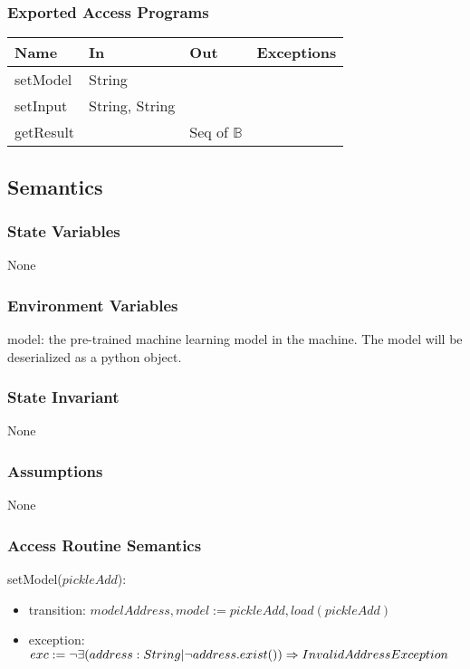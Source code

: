 \documentclass[12pt, titlepage]{article}
\begin{document}
\subsubsection{Exported Access Programs}

\begin{tabular}{l l l l}
\hline
\textbf{Name} & \textbf{In} & \textbf{Out} & \textbf{Exceptions} \\
\hline
setModel & String & ~ & ~\\
setInput & String, String & ~ & ~ \\
getResult & ~ & Seq of $\mathbb{B}$ & ~ \\
\hline
\end{tabular}

\subsection{Semantics}

\subsubsection{State Variables}
None

\subsubsection{Environment Variables}
model: the pre-trained machine learning model in the machine. The model will be
deserialized as a python object.

\subsubsection{State Invariant}
None

\subsubsection{Assumptions}
None

\subsubsection{Access Routine Semantics}

\noindent setModel($pickleAdd$):
\begin{itemize}
\item transition: $modelAddress, model := pickleAdd, load(pickleAdd)$
\item exception:  $exc := \neg \exists (address : String | \neg address.exist())
\Rightarrow \\ InvalidAddressException$
\end{itemize}
\end{document}
